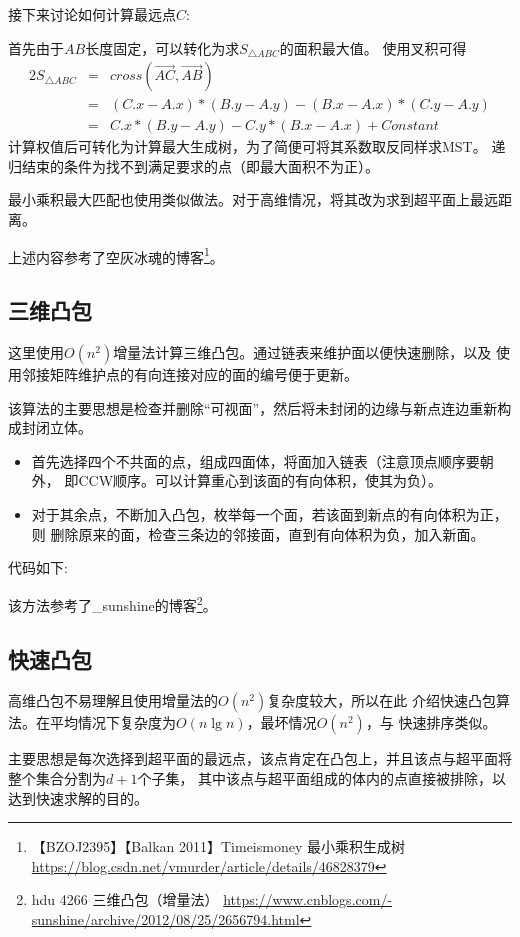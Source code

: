 接下来讨论如何计算最远点$C$:

首先由于$AB$长度固定，可以转化为求$S_{\triangle ABC}$的面积最大值。
使用叉积可得
\begin{eqnarray*}
	2S_{\triangle ABC}&=&cross(\overrightarrow{AC},\overrightarrow{AB})\\
	&=&(C.x-A.x)*(B.y-A.y)-(B.x-A.x)*(C.y-A.y)\\
	&=&C.x*(B.y-A.y)-C.y*(B.x-A.x)+Constant
\end{eqnarray*}
计算权值后可转化为计算最大生成树，为了简便可将其系数取反同样求MST。
递归结束的条件为找不到满足要求的点（即最大面积不为正）。

最小乘积最大匹配也使用类似做法。对于高维情况，将其改为求到超平面上最远距离。

上述内容参考了空灰冰魂的博客\footnote{
	【BZOJ2395】【Balkan 2011】Timeismoney 最小乘积生成树
	\url{https://blog.csdn.net/vmurder/article/details/46828379}
}。
\subsection{三维凸包}
这里使用$O(n^2)$增量法计算三维凸包。通过链表来维护面以便快速删除，以及
使用邻接矩阵维护点的有向连接对应的面的编号便于更新。

该算法的主要思想是检查并删除``可视面''，然后将未封闭的边缘与新点连边重新构成封闭立体。
\begin{itemize}
	\item 首先选择四个不共面的点，组成四面体，将面加入链表（注意顶点顺序要朝外，
	      即CCW顺序。可以计算重心到该面的有向体积，使其为负）。
	\item 对于其余点，不断加入凸包，枚举每一个面，若该面到新点的有向体积为正，则
	      删除原来的面，检查三条边的邻接面，直到有向体积为负，加入新面。
\end{itemize}

代码如下:


该方法参考了\_sunshine的博客\footnote{
	hdu 4266 三维凸包（增量法）
	\url{https://www.cnblogs.com/-sunshine/archive/2012/08/25/2656794.html}
}。
\subsection{快速凸包}
高维凸包不易理解且使用增量法的$O(n^2)$复杂度较大，所以在此
介绍快速凸包算法。在平均情况下复杂度为$O(n\lg n)$，最坏情况$O(n^2)$，与
快速排序类似。

主要思想是每次选择到超平面的最远点，该点肯定在凸包上，并且该点与超平面将整个集合分割为$d+1$个子集，
其中该点与超平面组成的体内的点直接被排除，以达到快速求解的目的。

